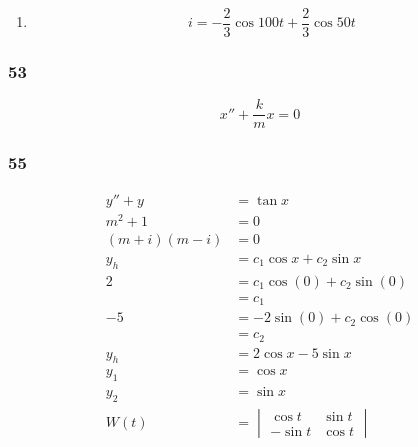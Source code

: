 \documentclass{article}
\begin{document}
\begin{enumerate}
  \item \[i = -\frac{2}{3} \cos 100 t + \frac{2}{3} \cos 50 t\]
\end{enumerate}

\subsubsection{53}

\[x'' + \frac{k}{m} x = 0\]

\subsubsection{55}

\begin{align*}
  y'' + y         & = \tan x                                                                      \\
  m^2 + 1         & = 0                                                                           \\
  (m + i) (m - i) & = 0                                                                           \\
  y_h             & = c_1 \cos x + c_2 \sin x                                                     \\
  2               & = c_1 \cos (0) + c_2 \sin (0)                                                 \\
                  & = c_1                                                                         \\
  -5              & = -2 \sin (0) + c_2 \cos (0)                                                  \\
                  & = c_2                                                                         \\
  y_h             & = 2 \cos x - 5 \sin x                                                         \\
  y_1             & = \cos x                                                                      \\
  y_2             & = \sin x                                                                      \\
  W(t)            & = \begin{vmatrix}
                        \cos t  & \sin t \\
                        -\sin t & \cos t
                      \end{vmatrix}                                                            \\

\end{align*}
\end{document}
